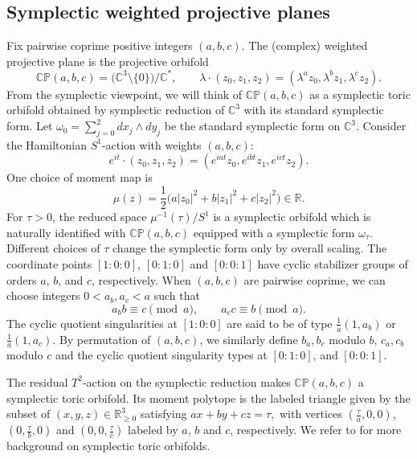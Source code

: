 \documentclass[11pt]{article}
\theoremstyle{definition}
\theoremstyle{remark}
\newcommand{\CP}{\mathbb{CP}}
\newcommand{\R}{\mathbb{R}}
\newcommand{\C}{\mathbb{C}}
\newcommand{\WCP}{\mathbb{CP}}
\begin{document}
\subsection{Symplectic weighted projective planes}

Fix pairwise coprime positive integers $(a,b,c)$.
The (complex) weighted projective plane is the projective  orbifold 
\[
 \CP(a,b,c)=\bigl(\C^{3}\setminus\{0\}\bigr)\big/\C^{*},
 \qquad
 \lambda\cdot(z_{0},z_{1},z_{2})=(\lambda^{a}z_{0},\lambda^{b}z_{1},\lambda^{c}z_{2}).
\]
From the symplectic viewpoint, we will think of $\CP(a,b,c)$ as a
symplectic toric orbifold obtained by symplectic reduction of $\C^{3}$ with its
standard symplectic form.
Let $\omega_{0}=\sum_{j=0}^{2} dx_{j}\wedge dy_{j}$ be the standard symplectic form on $\C^{3}$.
Consider the Hamiltonian $S^{1}$-action with weights $(a,b,c)$:
\[
 e^{it}\cdot(z_{0},z_{1},z_{2})=(e^{iat}z_{0},e^{ibt}z_{1},e^{ict}z_{2}).
\]
One choice of moment map is
\[
 \mu(z)=\frac12\bigl(a|z_{0}|^{2}+b|z_{1}|^{2}+c|z_{2}|^{2}\bigr)\in\R.
\]
For $\tau>0$, the reduced space
\(
 \mu^{-1}(\tau)\big/S^{1}
\)
is a symplectic orbifold which is naturally identified
with $\WCP(a,b,c)$ equipped with a symplectic form $\omega_{\tau}$. Different choices of $\tau$ change the symplectic form only by overall scaling. 
The coordinate points $[1:0:0]$, $[0:1:0]$ and $[0:0:1]$
have cyclic stabilizer groups of orders $a$, $b$, and $c$, respectively.
When $(a,b,c)$ are pairwise coprime, we can choose integers
$0<a_b,a_c<a$ such that
\[
a_b b\equiv c\pmod a,
\qquad
a_c c\equiv b\pmod a.
\]
 The cyclic quotient singularities at $[1:0:0]$  are said to be of type $\frac{1}{a}(1,a_b)$ or $\frac{1}{a}(1,a_c)$. By permutation of $(a,b,c)$, we similarly define
$b_a,b_c$ modulo $b$, $c_a,c_b$ modulo $c$ and the cyclic quotient singularity types at $[0:1:0]$, and $[0:0:1]$.


The residual $T^{2}$-action on the symplectic reduction makes $\WCP(a,b,c)$ a symplectic toric orbifold.
Its moment polytope is the labeled triangle
given by the subset of $(x,y,z)\in\R_{\ge 0}^{3}$ satisfying
\(
 a x+b y+c z=\tau,
\)
with vertices $(\frac{\tau}{a},0,0)$, $(0,\frac{\tau}{b},0)$ and $(0,0,\frac{\tau}{c})$ labeled by $a$, $b$ and $c$, respectively. We refer to \cite{lermantolman,Godinho,NP09} for more background on symplectic toric orbifolds.
\end{document}
